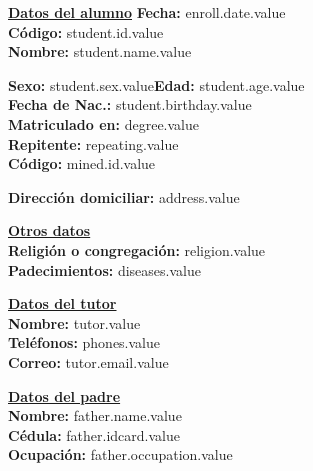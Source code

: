 \documentclass[12pt]{article}
\newcommand{\aField}[1]{#1}
\newcommand{\enrollDate}{enroll.date.value}
\newcommand{\studentName}{student.name.value}
\newcommand{\studentBirthday}{student.birthday.value}
\newcommand{\studentAge}{student.age.value}
\newcommand{\studentSex}{student.sex.value}
\newcommand{\isRepeating}{repeating.value}
\newcommand{\minedId}{mined.id.value}
\newcommand{\degree}{degree.value}
\newcommand{\address}{address.value}
\newcommand{\religion}{religion.value}
\newcommand{\diseases}{diseases.value}
\newcommand{\tutor}{tutor.value}
\newcommand{\phones}{phones.value}
\newcommand{\email}{tutor.email.value}
\newcommand{\fatherName}{father.name.value}
\newcommand{\fatherIdcard}{father.idcard.value}
\newcommand{\fatherOccupation}{father.occupation.value}
\newcommand{\studentId}{student.id.value}
\begin{document}
    \textbf{\uline{Datos del alumno}} \hfill \textbf{Fecha:} \enrollDate\\[1mm]
    \textbf{Código:} \aField{\studentId}\\
    \textbf{Nombre:} \aField{\studentName}
    \par\vspace{1mm}
    \begin{minipage}[t]{0.49\textwidth}
        \textbf{Sexo:} \aField{\studentSex}\hspace{6mm}\textbf{Edad:} \aField{\studentAge}\\
        \textbf{Fecha de Nac.:} \aField{\studentBirthday}\\
        \textbf{Matriculado en:} \aField{\degree}\\
        \textbf{Repitente:} \aField{\isRepeating}\\
        \textbf{Código:} \aField{\minedId}
    \end{minipage}
    \hfill
    \begin{minipage}[t]{0.49\textwidth}
        \textbf{Dirección domiciliar:} \aField{\address}
    \end{minipage}
    \par\vspace{4mm}
    \begin{minipage}[t]{0.49\textwidth}
        \textbf{\uline{Otros datos}}\\[1mm]
        \textbf{Religión o congregación:} \aField{\religion}\\
        \textbf{Padecimientos:} \aField{\diseases}
    \end{minipage}
    \hfill
    \begin{minipage}[t]{0.49\textwidth}
        \textbf{\uline{Datos del tutor}}\\[1mm]
        \textbf{Nombre:} \aField{\tutor}\\
        \textbf{Teléfonos:} \aField{\phones}\\
        \textbf{Correo:} \aField{\email}
    \end{minipage}
    \par\vspace{4mm}
    \begin{minipage}[t]{0.49\textwidth}
        \textbf{\uline{Datos del padre}}\\[1mm]
        \textbf{Nombre:} \aField{\fatherName}\\
        \textbf{Cédula:} \aField{\fatherIdcard}\\
        \textbf{Ocupación:} \aField{\fatherOccupation}
    \end{minipage}
\end{document}
